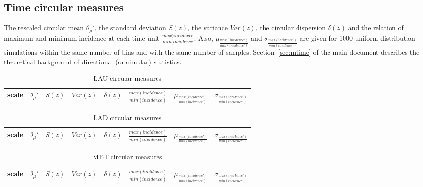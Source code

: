 \documentclass[%
 aip,
 jmp,%
 amsmath,amssymb,
 reprint,%
 floatfix,
]{revtex4-1}
\begin{document}
\subsection{Time circular measures}\label{si:circ}
The rescaled circular mean $\theta_\mu'$, the standard deviation $S(z)$, the variance $Var(z)$, the circular dispersion $\delta(z)$ and the relation of maximum and minimum incidence at each time unit $\frac{max(incidence}{min(incidence}$. Also, $ \mu_{\frac{max(incidence')}{min(incidence')}} $ and $ \sigma_{\frac{max(incidence')}{min(incidence')} }$ are given for 1000 uniform distribution simulations within the same number of bins and with the same number of samples. Section~\ref{sec:mtime} of the main document describes the theoretical background of directional (or circular) statistics.
\begin{table}[!h]
	\caption{LAU circular measures}
\begin{center}
    \begin{tabular}{ |l|| c|c|c|c|c||c|c| }
        \hline
scale & $\theta_\mu'$ & $S(z)$ & $Var(z)$ & $\delta(z)$ & $\frac{max(incidence)}{min(incidence)}$ & $ \mu_{\frac{max(incidence')}{min(incidence')}} $ & $ \sigma_{\frac{max(incidence')}{min(incidence')} } $ \\ \hline\hline
	
    \end{tabular}
\end{center}
\label{tab:circ}
\end{table}
\begin{table}[!h]
	\caption{LAD circular measures}
\begin{center}
    \begin{tabular}{ |l|| c|c|c|c|c||c|c| }
        \hline
scale & $\theta_\mu'$ & $S(z)$ & $Var(z)$ & $\delta(z)$ & $\frac{max(incidence)}{min(incidence)}$ & $ \mu_{\frac{max(incidence')}{min(incidence')}} $ & $ \sigma_{\frac{max(incidence')}{min(incidence')} } $ \\ \hline\hline
	
    \end{tabular}
\end{center}
\label{tab:circ}
\end{table}
\begin{table}[!h]
	\caption{MET circular measures}
\begin{center}
    \begin{tabular}{ |l|| c|c|c|c|c||c|c| }
        \hline
scale & $\theta_\mu'$ & $S(z)$ & $Var(z)$ & $\delta(z)$ & $\frac{max(incidence)}{min(incidence)}$ & $ \mu_{\frac{max(incidence')}{min(incidence')}} $ & $ \sigma_{\frac{max(incidence')}{min(incidence')} } $ \\ \hline\hline
	
    \end{tabular}
\end{center}
\label{tab:circ}
\end{table}
\end{document}
